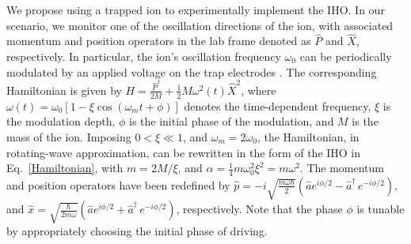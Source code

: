 \documentclass[prl,twocolumn,superscriptaddress,floatfix,showpacs,amsmath,longbibliography,nofootinbib,amssymb]{revtex4-1}
\newcommand{\col}[1]{\textcolor{red}{#1}}
\newcommand{\colp}[1]{\textcolor{purple}{#1}}
\begin{document}
We propose using a trapped ion to experimentally implement the IHO.
In our scenario, we monitor one of the oscillation directions of the ion,  
with associated momentum and position operators in the lab frame denoted as $\hat{P}$ and $\hat{X}$, respectively.
In particular, the ion's oscillation frequency $\omega_0$ can be 
periodically modulated by an applied voltage on the trap electrodes \cite{RevModPhys.75.281}.
The corresponding Hamiltonian is given by $H=\frac{\hat{P}^2}{2M}+\frac{1}{2}M\omega^2(t)\hat{X}^2$,
where $\omega(t)=\omega_0[1-\xi\cos(\omega_mt+\phi)]$ denotes the time-dependent frequency, $\xi$ is the modulation depth, $\phi$ is the initial phase of the modulation, and $M$ is the mass of the ion. 
Imposing $0<\xi\ll1$, and $\omega_m=2\omega_0$, 
the Hamiltonian, in rotating-wave approximation, 
can be rewritten in the form of the IHO 
in Eq.~\eqref{Hamiltonian}, with $m=2M/\xi$, and $\alpha=\frac{1}{4}m\omega_0^2\xi^2=m\omega^2$. The momentum and position 
operators have been redefined by $\hat{p}=-i\sqrt{\frac{m\omega\hbar}{2}}(\hat{a}e^{i\phi/2}-\hat{a}^\dagger\,e^{-i\phi/2})$,
and $\hat{x}=\sqrt{\frac{\hbar}{2m\omega}}(\hat{a}e^{i\phi/2}+\hat{a}^\dagger\,e^{-i\phi/2})$, respectively. Note that the phase $\phi$ is tunable by appropriately choosing the initial phase of driving. 

\end{document}
